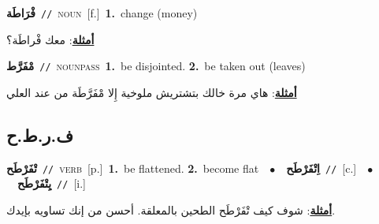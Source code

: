 \documentclass[10pt,a4paper,twoside]{article} %
\begin{document}
\begin{multicols}{2}
{\setlength\topsep{0pt}\textbf{\foreignlanguage{arabic}{فْرَاطَة}}\ {\color{gray}\texttt{//}\color{black}}\ \textsc{noun}\ [f.]\ \textbf{1.}~change (money)\  \begin{flushright}\color{gray}\foreignlanguage{arabic}{\textbf{\underline{\foreignlanguage{arabic}{أمثلة}}}: معك فْراطَة؟}\end{flushright}\color{black}} \vspace{2mm}

{\setlength\topsep{0pt}\textbf{\foreignlanguage{arabic}{مْفَرَّط}}\ {\color{gray}\texttt{//}\color{black}}\ \textsc{noun\textunderscore pass}\ \textbf{1.}~be disjointed.  \textbf{2.}~be taken out (leaves)\  \begin{flushright}\color{gray}\foreignlanguage{arabic}{\textbf{\underline{\foreignlanguage{arabic}{أمثلة}}}: هاي مرة خالك بتشتريش ملوخية إِلا مْفَرَّطَة من عند العلي}\end{flushright}\color{black}} \vspace{2mm}

\vspace{-3mm}
\subsection*{\color{blue}\foreignlanguage{arabic}{ف.ر.ط.ح}\color{blue}{}} 

{\setlength\topsep{0pt}\textbf{\foreignlanguage{arabic}{تْفَرْطَح}}\ {\color{gray}\texttt{//}\color{black}}\ \textsc{verb}\ [p.]\ \textbf{1.}~be flattened.  \textbf{2.}~become flat\ \ $\bullet$\ \ \setlength\topsep{0pt}\textbf{\foreignlanguage{arabic}{اِتْفَرْطَح}}\ {\color{gray}\texttt{//}\color{black}}\ [c.]\ \ $\bullet$\ \ \setlength\topsep{0pt}\textbf{\foreignlanguage{arabic}{يِتْفَرْطَح}}\ {\color{gray}\texttt{//}\color{black}}\ [i.]\  \begin{flushright}\color{gray}\foreignlanguage{arabic}{\textbf{\underline{\foreignlanguage{arabic}{أمثلة}}}: شوف كيف تْفَرْطَح الطحين بالمعلقة. أحسن من إنك تساويه بإيدك.}\end{flushright}\color{black}} \vspace{2mm}


\end{multicols}
\end{document}
